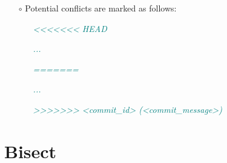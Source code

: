 \documentclass[a4paper,portrait,10pt]{article}   %
\newcommand{\mybulletlvA}{$\circ$}   %
\newcommand{\mysecvspace}{\vspace{6mm}}   %
\newcommand{\mytextfilecolor}{teal}   %
\begin{document}
\begin{itemize}
\item[\mybulletlvA] Potential conflicts are marked as follows:
\begin{itemize}
  \item[] \textcolor{\mytextfilecolor}{\textit{<{}<{}<{}<{}<{}<{}< HEAD}}
  \item[] \textcolor{\mytextfilecolor}{\textit{...}}
  \item[] \textcolor{\mytextfilecolor}{\textit{=======}}
  \item[] \textcolor{\mytextfilecolor}{\textit{...}}
  \item[] \textcolor{\mytextfilecolor}{\textit{>{}>{}>{}>{}>{}>{}> <commit\_id> (<commit\_message>)}}
\end{itemize}
\end{itemize}
\mysecvspace


\section{Bisect}   \label{sec:Bisect}
\end{document}
